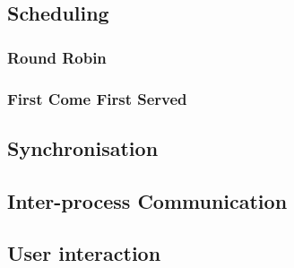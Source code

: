 \subsection{Scheduling}
    \subsubsection{Round Robin}
        \label{sec:RoundRobin}

    \subsubsection{First Come First Served}

\subsection{Synchronisation}
\subsection{Inter-process Communication}
\subsection{User interaction}
